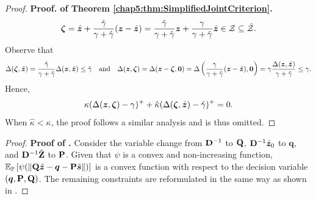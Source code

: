 \documentclass[opre, nonblindrev]{informswp}
\newcommand{\1}[1]{\mathds{1}{\left(#1\right)}}
\begin{document}
\begin{appendices}
\begin{proof}{\bf Proof. of Theorem \ref{chap5:thm:SimplifiedJointCriterion}.}
$$
\bm \zeta = \hat{\bm{z}} + \frac{\hat \gamma}{\gamma +\hat\gamma }(\bm z - \hat{\bm{z}}) =  \frac{\hat \gamma}{\gamma +\hat\gamma }\bm z + \frac{\gamma}{\gamma +\hat\gamma }\hat{\bm{z}} \in \mathcal{Z} \subseteq \hat {\mathcal{Z}}. 
$$
Observe that 
$$
\Delta(\bm \zeta,\hat{\bm{z}}) = \frac{\hat \gamma}{\gamma +\hat\gamma } \Delta(\bm z,\hat{\bm{z}}) \leq \hat \gamma
~~~\text{and}~~~
\Delta(\bm z,\bm \zeta)=\Delta(\bm z - \bm \zeta,\bm 0) = \Delta\left(  \frac{\gamma}{\gamma +\hat\gamma }(\bm z - \hat{\bm{z}}),\bm 0\right) = \gamma \frac{\Delta(\bm z,\hat{\bm{z}})}{\gamma + \hat \gamma} \leq \gamma.
$$
Hence,
$$
\kappa (  \Delta(\bm z,\bm \zeta) - \gamma)^+ + \hat \kappa ( \Delta(\bm \zeta,\hat{\bm{z}}) - \hat \gamma)^+ = 0. 
$$
When $\hat \kappa < \kappa$, the proof follows a similar analysis and is thus omitted.
\hfill \Halmos
\end{proof}
\vspace{3mm}

\begin{proof}{\bf Proof of .}
Consider the variable change from ${\mathbf{D}}^{-1}$ to ${\mathbf{Q}}$, ${\mathbf{D}}^{-1} \hat{\bm{z}}_0$ to $\bm q$, and ${\mathbf{D}}^{-1} {\hat{\mathbf{Z}}}$ to ${\mathbf{P}}$. Given that $\psi$ is a convex and non-increasing function, $\mathbb{E}_{\mathbb{P}}\left[\psi(\|{\mathbf{Q}} \tilde{\bm{z}} - \bm q - {\mathbf{P}} \tilde{\bm{s}}\|)\right]$ is a convex function with respect to the decision variable $(\bm q,{\mathbf{P}},{\mathbf{Q}})$. The remaining constraints are reformulated in the same way as shown in .
\hfill \Halmos
\end{proof}
\vspace{3mm}


\end{appendices}
\end{document}
